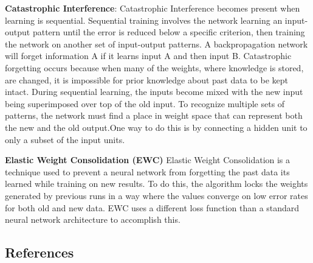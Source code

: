 \documentclass[draftclsnofoot, onecolumn, 10pt, compsoc]{IEEEtran}
\begin{document}
\noindent\textbf{Catastrophic Interference}: Catastrophic Interference becomes present when learning is sequential. Sequential training involves the network learning an input-output pattern until the error is reduced below a specific criterion, then training the network on another set of input-output patterns. A backpropagation network will forget information A if it learns input A and then input B. Catastrophic forgetting occurs because when many of the weights, where knowledge is stored, are changed, it is impossible for prior knowledge about past data to be kept intact. During sequential learning, the inputs become mixed with the new input being superimposed over top of the old input. To recognize multiple sets of patterns, the network must find a place in weight space that can represent both the new and the old output.One way to do this is by connecting a hidden unit to only a subset of the input units. \cite{ImgRecog}
\cite{miller}

\noindent\textbf{Elastic Weight Consolidation (EWC)}
Elastic Weight Consolidation is a technique used to prevent a neural network from forgetting the past data its learned while training on new results. To do this, the algorithm locks the weights generated by previous runs in a way where the values converge on low error rates for both old and new data. EWC uses a different loss function than a standard neural network architecture to accomplish this.

\subsection{References}


\end{document}
